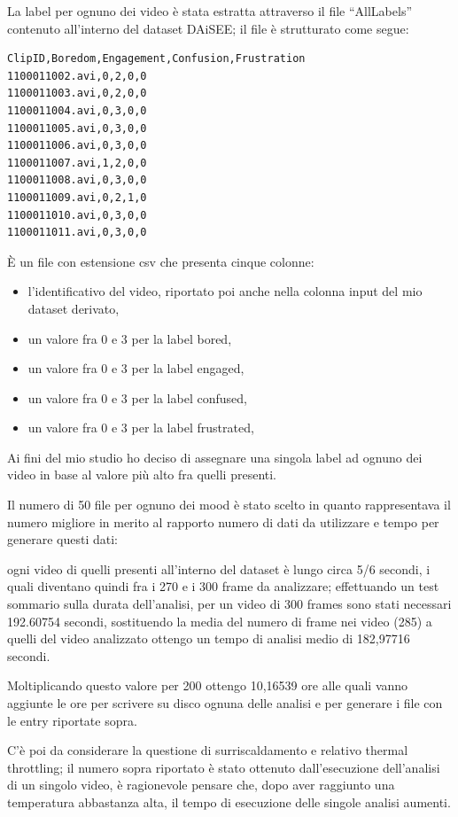 La label per ognuno dei video è stata estratta attraverso il file “AllLabels” contenuto all’interno del dataset DAiSEE; il file è strutturato come segue:
\begin{verbatim}
ClipID,Boredom,Engagement,Confusion,Frustration 
1100011002.avi,0,2,0,0
1100011003.avi,0,2,0,0
1100011004.avi,0,3,0,0
1100011005.avi,0,3,0,0
1100011006.avi,0,3,0,0
1100011007.avi,1,2,0,0
1100011008.avi,0,3,0,0
1100011009.avi,0,2,1,0
1100011010.avi,0,3,0,0
1100011011.avi,0,3,0,0
\end{verbatim}
È un file con estensione csv che presenta cinque colonne:
\begin{itemize}
\item l’identificativo del video, riportato poi anche nella colonna input del mio dataset derivato,
\item un valore fra 0 e 3 per la label bored,
\item un valore fra 0 e 3 per la label engaged,
\item un valore fra 0 e 3 per la label confused,
\item un valore fra 0 e 3 per la label frustrated,
\end{itemize} 
Ai fini del mio studio ho deciso di assegnare una singola label ad ognuno dei video in base al valore più alto fra quelli presenti.

Il numero di 50 file per ognuno dei mood è stato scelto in quanto rappresentava il numero migliore  in merito al rapporto numero di dati da utilizzare e tempo per generare questi dati:

ogni video di quelli presenti all’interno del dataset \cite{DAiSEE} è lungo circa 5/6 secondi, i quali diventano quindi fra i 270 e i 300 frame da analizzare; effettuando un test sommario sulla durata dell’analisi, per un video di 300 frames sono stati necessari 192.60754 secondi, sostituendo la media del numero di frame nei video (285) a quelli del video analizzato ottengo un tempo di analisi medio di 182,97716 secondi.

Moltiplicando questo valore per 200 ottengo 10,16539 ore alle quali vanno aggiunte le ore per scrivere su disco ognuna delle analisi e per generare i file con le entry riportate sopra. 

C’è poi da considerare la questione di surriscaldamento e relativo thermal throttling; il numero sopra riportato è stato ottenuto dall’esecuzione dell’analisi di un singolo video, è ragionevole pensare che, dopo aver raggiunto una temperatura abbastanza alta, il tempo di esecuzione delle singole analisi aumenti. 


